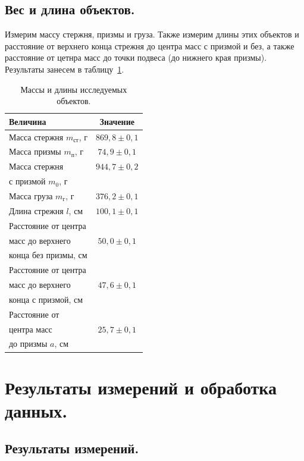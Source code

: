 \documentclass[a4paper,11pt]{article}
\begin{document}
\subsection{Вес и длина объектов.}
Измерим массу стержня, призмы и груза. Также измерим длины этих объектов и расстояние от верхнего конца стрежня до центра масс с призмой и без, а также расстояние от цетнра масс до точки подвеса (до нижнего края призмы). Результаты занесем в таблицу~\ref{table:tab1}.
\begin{table}[h!]
\centering
\begin{tabular}{ ||l|c|| }
  \hline
  Величина & Значение \\
  \hline
  Масса стержня $m_{ст}$, $г$ & $869,8 \pm 0,1$ \\
  \hline
  Масса призмы $m_{п}$, $г$ & $74,9 \pm 0,1$ \\
  \hline
  Масса стержня & $944,7 \pm 0,2$ \\
  с призмой $m_{0}$, $г$ & \\
  \hline
  Масса груза $m_{г}$, $г$ & $376,2 \pm 0,1$ \\
  \hline
  Длина стрежня $l$, $см$ & $100,1 \pm 0,1$ \\
  \hline
  Расстояние от центра & \\
  масс до верхнего & $50,0 \pm 0,1$ \\
  конца без призмы, $см$ & \\
  \hline
  Расстояние от центра & \\
  масс до верхнего & $47,6 \pm 0,1$ \\
  конца с призмой, $см$ & \\
  \hline
  Расстояние от & \\
  центра масс & $25,7 \pm 0,1$ \\
  до призмы $a$, $см$ & \\
  \hline
\end{tabular}
    \caption{Массы и длины исследуемых объектов.}
    \label{table:tab1}
\end{table}\newline
\section{Результаты измерений и обработка данных.}
\subsection{Результаты измерений.}
\end{document}
